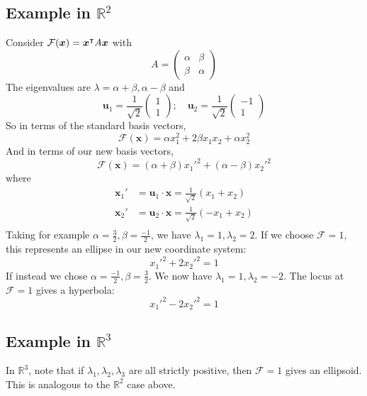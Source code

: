 \documentclass{article}
\begin{document}
\subsection{Example in $\mathbb R^2$}
Consider $\mathcal F(\bm x) = \bm x^\intercal A \bm x$ with
\[ A = \begin{pmatrix}
		\alpha & \beta \\ \beta & \alpha
	\end{pmatrix} \]
The eigenvalues are $\lambda = \alpha + \beta, \alpha - \beta$ and
\[ \bm u_1 = \frac{1}{\sqrt 2}\begin{pmatrix}
		1 \\ 1
	\end{pmatrix};\quad \bm u_2 = \frac{1}{\sqrt 2}\begin{pmatrix}
		-1 \\ 1
	\end{pmatrix} \]
So in terms of the standard basis vectors,
\[ \mathcal F(\bm x) = \alpha x_1^2 + 2\beta x_1x_2 + \alpha x_2^2 \]
And in terms of our new basis vectors,
\[ \mathcal F(\bm x) = (\alpha + \beta) x_1'^2 + (\alpha - \beta) x_2'^2 \]
where
\begin{align*}
	\bm x_1' & = \bm u_1 \cdot \bm x = \frac{1}{\sqrt 2}(x_1 + x_2)  \\
	\bm x_2' & = \bm u_2 \cdot \bm x = \frac{1}{\sqrt 2}(-x_1 + x_2) \\
\end{align*}
Taking for example $\alpha = \frac{3}{2}, \beta = \frac{-1}{2}$, we have $\lambda_1 = 1, \lambda_2 = 2$. If we choose $\mathcal F = 1$, this represents an ellipse in our new coordinate system:
\[ x_1'^2 + 2x_2'^2 = 1 \]
If instead we chose $\alpha = \frac{-1}{2}, \beta = \frac{3}{2}$. We now have $\lambda_1 = 1, \lambda_2 = -2$. The locus at $\mathcal F = 1$ gives a hyperbola:
\[ x_1'^2 - 2x_2'^2 = 1 \]

\subsection{Example in $\mathbb R^3$}
In $\mathbb R^3$, note that if $\lambda_1, \lambda_2, \lambda_3$ are all strictly positive, then $\mathcal F = 1$ gives an ellipsoid. This is analogous to the $\mathbb R^2$ case above.
\end{document}
